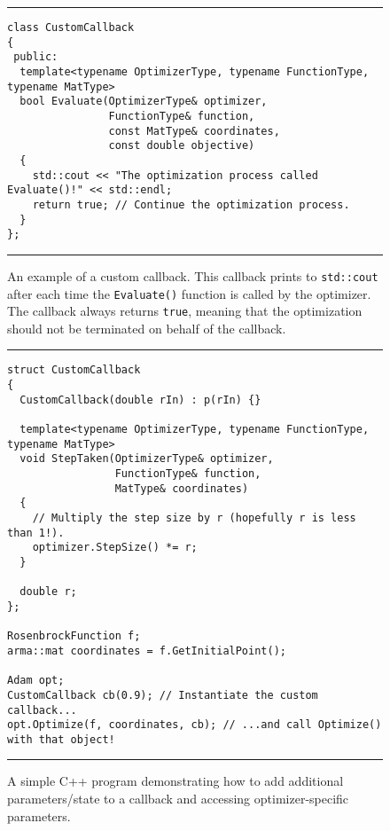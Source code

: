 \begin{figure}[!b]
\centering
\hrule
\vspace{1ex}
\begin{verbatim}
class CustomCallback
{
 public:
  template<typename OptimizerType, typename FunctionType, typename MatType>
  bool Evaluate(OptimizerType& optimizer,
                FunctionType& function,
                const MatType& coordinates,
                const double objective)
  {
    std::cout << "The optimization process called Evaluate()!" << std::endl;
    return true; // Continue the optimization process.
  }
};
\end{verbatim}
\hrule
\vspace*{-0.5em}
\caption
  {
  An example of a custom callback.  This callback prints to {\tt std::cout}
after each time the {\tt Evaluate()} function is called by the optimizer.  The
callback always returns {\tt true}, meaning that the optimization should not be
terminated on behalf of the callback.
  }
\label{fig:example_prog_callbacks_2}
\end{figure}

\begin{figure}[b!]
\centering
\hrule
\vspace{1ex}
\begin{verbatim}
struct CustomCallback
{
  CustomCallback(double rIn) : p(rIn) {}

  template<typename OptimizerType, typename FunctionType, typename MatType>
  void StepTaken(OptimizerType& optimizer,
                 FunctionType& function,
                 MatType& coordinates)
  {
    // Multiply the step size by r (hopefully r is less than 1!).
    optimizer.StepSize() *= r;
  }

  double r;
};

RosenbrockFunction f;
arma::mat coordinates = f.GetInitialPoint();

Adam opt;
CustomCallback cb(0.9); // Instantiate the custom callback...
opt.Optimize(f, coordinates, cb); // ...and call Optimize() with that object!
\end{verbatim}
\hrule
\vspace*{-0.5em}
\caption
  {
  A simple C++ program demonstrating how to add additional parameters/state to a
callback and accessing optimizer-specific parameters.
  }
\label{fig:example_prog_callbacks_parameter}
\end{figure}

